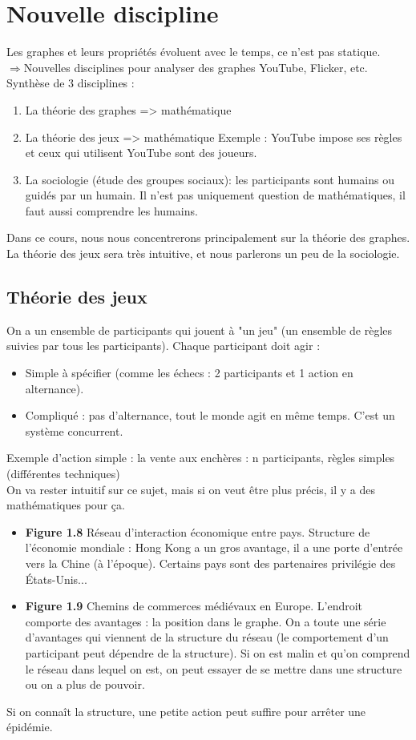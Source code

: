 \section{Nouvelle discipline}
Les graphes et leurs propriétés évoluent avec le temps, ce n'est pas statique.\\
$\Rightarrow$Nouvelles disciplines pour analyser des graphes YouTube, Flicker, etc.\\
Synthèse de 3 disciplines :
\begin{enumerate}

	\item La théorie des graphes => mathématique
	\item La théorie des jeux => mathématique
		Exemple : YouTube impose ses règles et ceux qui utilisent YouTube sont des joueurs.
	\item La sociologie (étude des groupes sociaux): les participants sont humains ou guidés par un humain. Il n'est pas uniquement question de mathématiques, il faut aussi comprendre les humains.\\
\end{enumerate}
Dans ce cours, nous nous concentrerons principalement sur la théorie des graphes. La théorie des jeux sera très intuitive, et nous parlerons un peu de la sociologie.
\subsection{Théorie des jeux}
On a un ensemble de participants qui jouent à "un jeu" (un ensemble de règles suivies par tous les participants). Chaque participant doit agir : 
\begin{itemize}

\item Simple à spécifier (comme les échecs : 2 participants et 1 action en alternance). 
\item Compliqué : pas d'alternance, tout le monde agit en même temps. C'est un système concurrent.
\end{itemize}
Exemple d'action simple : la vente aux enchères : 
	n participants,
	règles simples (différentes techniques) \\
	
On va rester intuitif sur ce sujet, mais si on veut être plus précis, il y a des mathématiques pour ça.
\begin{itemize}

\item \textbf{Figure 1.8} Réseau d'interaction économique entre pays. Structure de l'économie mondiale : Hong Kong a un gros avantage, il a une porte d'entrée vers la Chine (à l'époque). Certains pays sont des partenaires privilégie des États-Unis... 
\item \textbf{Figure 1.9} Chemins de commerces médiévaux en Europe. L'endroit comporte des avantages : la position dans le graphe. On a toute une série d'avantages qui viennent de la structure du réseau (le comportement d'un participant peut dépendre de la structure). Si on est malin et qu'on comprend le réseau dans lequel on est, on peut essayer de se mettre dans une structure ou on a plus de pouvoir. 
\end{itemize}
Si on connaît la structure, une petite action peut suffire pour arrêter une épidémie.

